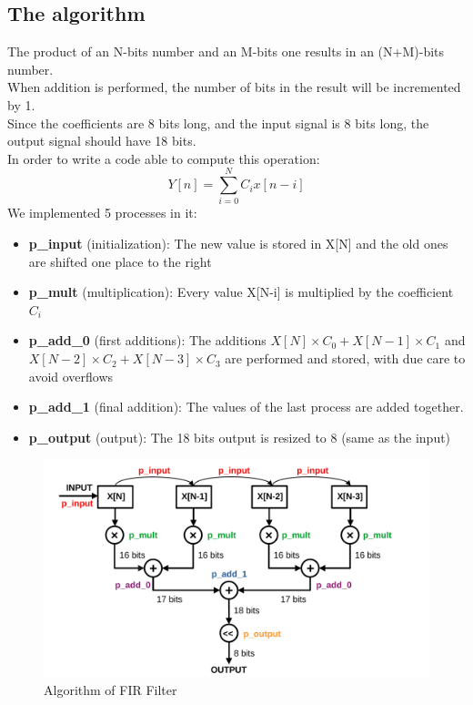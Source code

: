 \documentclass[11pt,a4paper,twocolumn]{IEEEtran}
\begin{document}
	\subsection*{The algorithm}
	The product of an N-bits number and an M-bits one results in an (N+M)-bits number.\\
	When addition is performed, the number of bits in the result will be incremented by 1.\\
	Since the coefficients are 8 bits long, and the input signal is 8 bits long, the output signal should have 18 bits.\\
	In order to write a code able to compute this operation:
	$$ Y[n] = \sum_{i=0}^N C_i x[n-i] $$
	We implemented 5 processes in it:
	\begin{itemize}
	\item\textbf{p\_input} (initialization): The new value is stored in X[N] and the old ones are shifted one place to the right
	\item\textbf{p\_mult} (multiplication): Every value X[N-i] is multiplied by the coefficient $C_i$
	\item\textbf{p\_add\_0} (first additions): The additions $X[N]\times C_0 + X[N-1]\times C_1$ and $X[N-2]\times C_2 + X[N-3]\times C_3$ are performed and stored, with due care to avoid overflows
	\item\textbf{p\_add\_1} (final addition): The values of the last process are added together.
	\item\textbf{p\_output} (output): The 18 bits output is resized to 8 (same as the input)
	\end{itemize}
\begin{figure}[h]
	\hspace*{-.5cm}
	\includegraphics[width=1.2\linewidth]{img/firalg1pdf}
	\caption{Algorithm of FIR Filter}
\end{figure}
\end{document}
